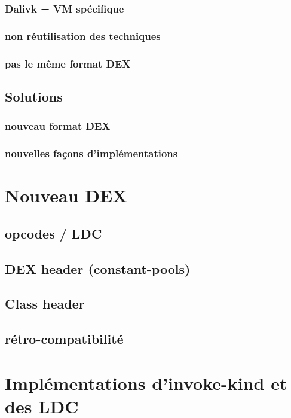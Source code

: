 \documentclass{sigplanconf}
\begin{document}
    \subsubsection{Dalivk = VM sp\'ecifique}
    \subsubsection{non r\'eutilisation des techniques}
    \subsubsection{pas le m\^eme format DEX}

  \subsection{Solutions}

    \subsubsection{nouveau format DEX}
    \subsubsection{nouvelles fa\c cons d'impl\'ementations}

\section{Nouveau DEX}

  \subsection{opcodes / LDC}
  \subsection{DEX header (constant-pools)}
  \subsection{Class header}
  \subsection{r\'etro-compatibilit\'e}

\section{Impl\'ementations d'invoke-kind et des LDC}
\end{document}
